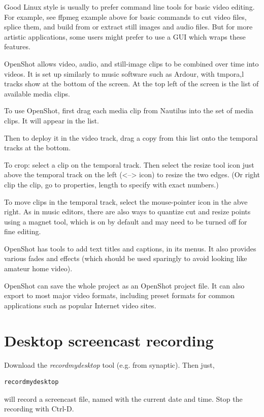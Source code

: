 \documentclass[oneside,english]{scrbook}
\begin{document}
Good Linux style is usually to prefer command line tools for basic video editing. For example, see ffpmeg example above for basic commands to cut video files, splice them, and build from or extract still images and audio files.  But for more artistic applications, some users might prefer to use a GUI which wraps these features.

OpenShot allows video, audio, and still-image clips to be combined over time into videos.  It is set up similarly to music software such as Ardour, with tmpora,l tracks show at the bottom of the screen.   At the top left of the screen is the list of available media clips.  

To use OpenShot, first drag each media clip from Nautilus into the set of media clips.  It will appear in the list.  

Then to deploy it in the video track, drag a copy from this list onto the temporal tracks at the bottom.

To crop: select a clip on the temporal track. Then select the resize tool icon just above the temporal track on the left (<--> icon) to resize the two edges.  (Or right clip the clip, go to properties, length to specify with exact numbers.)

To move clips in the temporal track, select the mouse-pointer icon in the abve right.   As in music editors, there are also ways to quantize cut and resize points using a magnet tool, which is on by default and may need to be turned off for fine editing.

OpenShot has tools to add text titles and captions, in its menus.  It also provides various fades and effects (which should be used sparingly to avoid looking like amateur home video).

OpenShot can save the whole project as an OpenShot project file.  It can also export to most major video formats, including preset formats for common applications such as popular Internet video sites.



\section{Desktop screencast recording}

Download the {\em recordmydesktop} tool (e.g. from synaptic). Then just,
\begin{lstlisting}
recordmydesktop
\end{lstlisting}
will record a screencast file, named with the current date and time.  Stop the recording with Ctrl-D.
\end{document}
